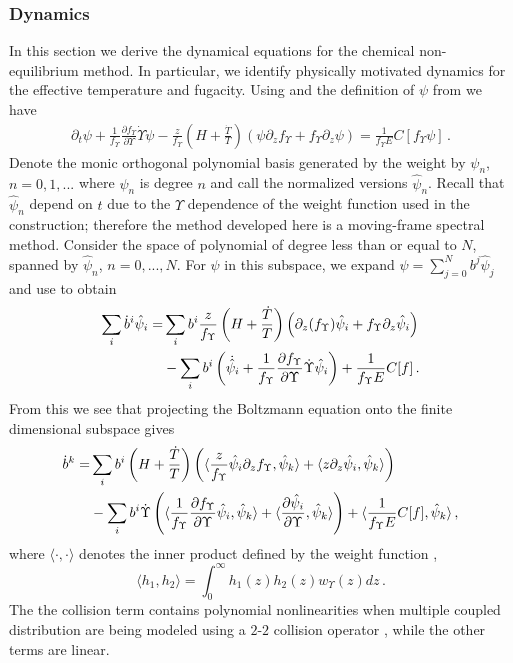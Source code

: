 
\subsubsection{Dynamics}\label{dynamics_sec}
In this section we derive the dynamical equations for the chemical non-equilibrium method.  In particular, we identify physically motivated dynamics for the effective temperature and fugacity.  Using  and the definition of $\psi$ from  we have
\begin{align}\label{near_equilib_eq}
\partial_t \psi+\frac{1}{f_\Upsilon }\frac{\partial f_\Upsilon }{\partial\Upsilon}\dot\Upsilon\psi-\frac{z}{f_\Upsilon }\left(H+\frac{\dot{T}}{T}\right)\left(\psi\partial_zf_\Upsilon +f_\Upsilon \partial_z \psi\right)=\frac{1}{f_\Upsilon E}C[f_\Upsilon \psi]\,.
\end{align}
Denote the monic orthogonal polynomial basis generated by the weight  by $\psi_n$, $n=0,1,...$ where $\psi_n$ is degree $n$ and call the normalized versions  $\hat{\psi}_n$. Recall that $\hat\psi_n$ depend on $t$ due to the $\Upsilon$ dependence of the weight function used in the construction; therefore the method developed here is a moving-frame spectral method. Consider the space of polynomial of degree less than or equal to $N$, spanned by $\hat\psi_n$, $n=0,...,N$.   For $\psi$ in this subspace, we expand $\psi=\sum_{j=0}^Nb^j\hat\psi_j$ and use   to obtain
\begin{align}\label{T_vars}
\sum_i \dot{b}^i\hat\psi_i=&\sum_ib^i\frac{z}{f_\Upsilon }\left(H+\frac{\dot{T}}{T}\right)\left(\partial_z(f_\Upsilon )\hat\psi_i+f_\Upsilon \partial_z\hat\psi_i\right)\\
&-\sum_ib^i\left(\dot{\hat{\psi}}_i+\frac{1}{f_\Upsilon }\frac{\partial f_\Upsilon }{\partial\Upsilon}\dot\Upsilon\hat\psi_i\right)+\frac{1}{f_\Upsilon E}C[f]\,.
\notag
\end{align}
From this we see  that  projecting the Boltzmann equation onto the finite dimensional subspace gives
\begin{align}
\dot b^k=& \sum_i b^i\left(H+\frac{\dot{T}}{T}\right)\left(\langle\frac{z}{f_\Upsilon }\hat\psi_i\partial_zf_\Upsilon ,\hat\psi_k\rangle+\langle z\partial_z \hat\psi_i,\hat\psi_k\rangle\right) \\
&-\sum_i b^i\dot{\Upsilon}\left(\langle\frac{1}{f_\Upsilon }\frac{\partial f_\Upsilon }{\partial\Upsilon}\hat\psi_i,\hat\psi_k\rangle+\langle\frac{\partial\hat{\psi}_i}{\partial \Upsilon},\hat\psi_k\rangle\right)+\langle\frac{1}{f_\Upsilon E}C[f],\hat\psi_k\rangle\notag\,,
\end{align}
where $\langle\cdot,\cdot\rangle$ denotes the inner product defined by the weight function ,
\begin{equation}
\langle h_1,h_2\rangle=\int_0^\infty h_1(z)h_2(z)w_\Upsilon(z)dz\,.
\end{equation}
The the collision term contains polynomial nonlinearities when multiple coupled distribution are being modeled using a $2$-$2$ collision operator , while the other terms are linear.  

